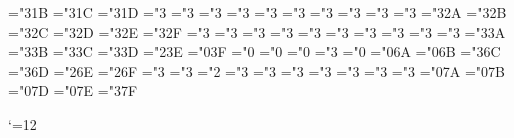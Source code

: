 \mathchardef\gnapprox="3\msy@1B
\mathchardef\nsim="3\msy@1C
\mathchardef\ncong="3\msy@1D
\def\napprox{\not\approx}
\mathchardef\varsubsetneq="3
\mathchardef\varsupsetneq="3
\mathchardef\nsubseteqq="3
\mathchardef\nsupseteqq="3
\mathchardef\subsetneqq="3
\mathchardef\supsetneqq="3
\mathchardef\varsubsetneqq="3
\mathchardef\varsupsetneqq="3
\mathchardef\subsetneq="3
\mathchardef\supsetneq="3
\mathchardef\nsubseteq="3\msy@2A
\mathchardef\nsupseteq="3\msy@2B
\mathchardef\nparallel="3\msy@2C
\mathchardef\nmid="3\msy@2D
\mathchardef\nshortmid="3\msy@2E
\mathchardef\nshortparallel="3\msy@2F
\mathchardef\nvdash="3
\mathchardef\nVdash="3
\mathchardef\nvDash="3
\mathchardef\nVDash="3
\mathchardef\ntrianglerighteq="3
\mathchardef\ntrianglelefteq="3
\mathchardef\ntriangleleft="3
\mathchardef\ntriangleright="3
\mathchardef\nleftarrow="3
\mathchardef\nrightarrow="3
\mathchardef\nLeftarrow="3\msy@3A
\mathchardef\nRightarrow="3\msy@3B
\mathchardef\nLeftrightarrow="3\msy@3C
\mathchardef\nleftrightarrow="3\msy@3D
\mathchardef\divideontimes="2\msy@3E
\mathchardef\varnothing="0\msy@3F
\mathchardef\nexists="0
\mathchardef\mho="0
\mathchardef\eth="0
\mathchardef\eqsim="3
\mathchardef\beth="0
\mathchardef\gimel="0\msy@6A
\mathchardef\daleth="0\msy@6B
\mathchardef\lessdot="3\msy@6C
\mathchardef\gtrdot="3\msy@6D
\mathchardef\ltimes="2\msy@6E
\mathchardef\rtimes="2\msy@6F
\mathchardef\shortmid="3
\mathchardef\shortparallel="3
\mathchardef\smallsetminus="2
\mathchardef\thicksim="3
\mathchardef\thickapprox="3
\mathchardef\approxeq="3
\mathchardef\succapprox="3
\mathchardef\precapprox="3
\mathchardef\curvearrowleft="3
\mathchardef\curvearrowright="3
\mathchardef\digamma="0\msy@7A
\mathchardef\varkappa="0\msy@7B
\mathchardef\hslash="0\msy@7D
\mathchardef\hbar="0\msy@7E
\mathchardef\backepsilon="3\msy@7F
\def\Bbb{\ifmmode\let\next\Bbb@\else
 \def\next{\errmessage{Use \string\Bbb\space only in math mode}}\fi\next}
\def\Bbb@#1{{\Bbb@@{#1}}}
\def\Bbb@@#1{\fam\msyfam#1}

\catcode`\@=12
